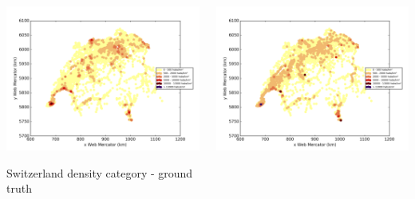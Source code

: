 \documentclass[c]{beamer}
\begin{document}
\begin{frame}
\begin{columns}
 \begin{column}{0.5\textwidth}
  \begin{overlayarea}{\linewidth}{4cm}
    \centering\vfill
    \includegraphics[scale=0.25]{../../data/Suisse/test/Support_Vector_Gaussian_Classification/Support_Vector_Gaussian_Classification/density_ground_truth.png}
  \end{overlayarea}
  \begin{overlayarea}{\linewidth}{0.5cm}
    \centering
    \tiny Switzerland density category - ground truth\par
  \end{overlayarea}
 \end{column}
 \begin{column}{0.5\textwidth}
  \begin{overlayarea}{\linewidth}{4cm}
    \centering\vfill
    \includegraphics[scale=0.25]{../../data/Suisse/test/Support_Vector_Gaussian_Classification/Support_Vector_Gaussian_Classification/density_classification.png}

\end{overlayarea}
\end{column}
\end{columns}
\end{frame}
\end{document}

